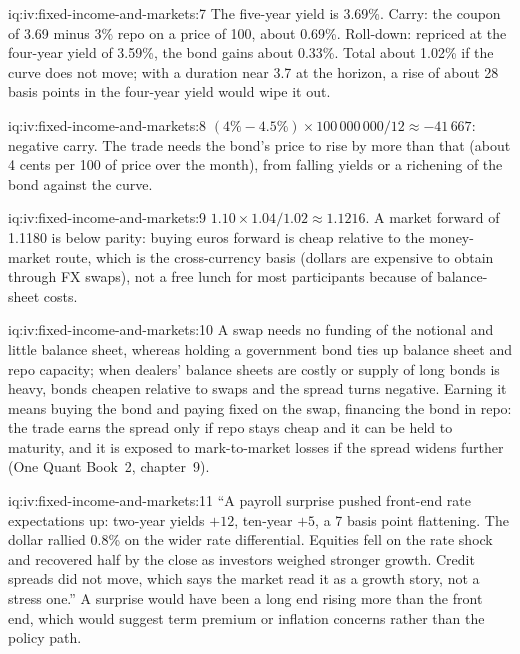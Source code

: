 \begin{solution}{iq:iv:fixed-income-and-markets:7}
The five-year yield is 3.69\%. Carry: the coupon of 3.69 minus 3\% repo on a price of 100, about 0.69\%. Roll-down: repriced at
the four-year yield of 3.59\%, the bond gains about 0.33\%. Total about 1.02\% if the curve does not move; with a duration near
3.7 at the horizon, a rise of about 28 basis points in the four-year yield would wipe it out.
\end{solution}

\begin{solution}{iq:iv:fixed-income-and-markets:8}
$(4\% - 4.5\%) \times 100\,000\,000/12 \approx -41\,667$: negative carry. The trade needs the bond's price to rise by more than
that (about 4 cents per 100 of price over the month), from falling yields or a richening of the bond against the curve.
\end{solution}

\begin{solution}{iq:iv:fixed-income-and-markets:9}
$1.10 \times 1.04/1.02 \approx 1.1216$. A market forward of 1.1180 is below parity: buying euros forward is cheap relative to
the money-market route, which is the cross-currency basis (dollars are expensive to obtain through FX swaps), not a free lunch
for most participants because of balance-sheet costs.
\end{solution}

\begin{solution}{iq:iv:fixed-income-and-markets:10}
A swap needs no funding of the notional and little balance sheet, whereas holding a government bond ties up balance sheet and
repo capacity; when dealers' balance sheets are costly or supply of long bonds is heavy, bonds cheapen relative to swaps and the
spread turns negative. Earning it means buying the bond and paying fixed on the swap, financing the bond in repo: the trade
earns the spread only if repo stays cheap and it can be held to maturity, and it is exposed to mark-to-market losses if the
spread widens further (One Quant Book~2, chapter~9).
\end{solution}

\begin{solution}{iq:iv:fixed-income-and-markets:11}
``A payroll surprise pushed front-end rate expectations up: two-year yields $+12$, ten-year $+5$, a 7 basis point flattening.
The dollar rallied 0.8\% on the wider rate differential. Equities fell on the rate shock and recovered half by the close as
investors weighed stronger growth. Credit spreads did not move, which says the market read it as a growth story, not a stress
one.'' A surprise would have been a long end rising more than the front end, which would suggest term premium or inflation
concerns rather than the policy path.
\end{solution}

